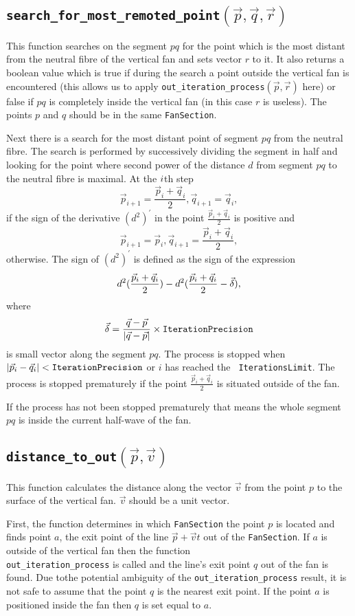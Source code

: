 \documentclass{article}
\begin{document}
\subsection{\tt search\_for\_most\_remoted\_point$(\vec{p}, \vec{q}, \vec{r})$}
This function searches on the segment $pq$ for the point which is the
most distant from the neutral fibre of the vertical fan and sets
vector $r$ to it. It also returns a boolean value which is true if
during the search a point outside the vertical fan is encountered
(this allows us to apply {\tt out\_iteration\_process$(\vec{p},
\vec{r})$} here) or false if $pq$ is completely inside the vertical
fan (in this case $r$ is useless). The points $p$ and $q$ should be in
the same {\tt FanSection}.

Next there is a search for the most distant point of segment
$pq$ from the neutral fibre. The search is performed by successively 
dividing the segment in half and looking for the point
where second power of the distance $d$
from segment $pq$ to the neutral fibre is maximal.
At the $i\/$th step 
\[ \vec{p}_{i+1} = \frac{\vec{p}_i+\vec{q}_i}{2}, \vec{q}_{i+1} = \vec{q}_i,\]
if the sign of the derivative $(d^2)^{\prime}$ in the point
$\frac{\vec{p}_i+\vec{q}_i}{2}$ is positive and 
\[\vec{p}_{i+1} = \vec{p}_i, \vec{q}_{i+1} = \frac{\vec{p}_i+\vec{q}_i}{2},\]
otherwise. 
The sign of $(d^2)^{\prime}$ is defined as the sign of the expression
\[d^2(\frac{\vec{p}_i+\vec{q}_i}{2}) -
d^2(\frac{\vec{p}_i+\vec{q}_i}{2}-\vec{\delta})\/,\] where \[\vec{\delta} =
\frac{\vec{q}-\vec{p}}{|\vec{q}-\vec{p}|}\times{\tt IterationPrecision}\] is
small vector along the segment $pq$. 
The process is stopped when 
$|\vec{p}_i-\vec{q}_i|<{\tt IterationPrecision}$ or $i$ has reached the {\tt
IterationsLimit\/}. The process is stopped prematurely if the point
$\frac{\vec{p}_i+\vec{q}_i}{2}$ is situated outside of the fan.

If the process has not been stopped prematurely that means the whole segment
$pq$ is inside the current half-wave of the fan.

\subsection{\tt distance\_to\_out$(\vec{p}, \vec{v})$}
This function calculates the distance along the vector
$\vec{v}$ from the point $p$ to the surface of the vertical fan. $\vec{v}$
should be a unit vector. 

First, the function determines in which {\tt FanSection} the point $p$
is located and finds point $a$, the exit point of the line
$\vec{p}+\vec{v}t$ out of the {\tt FanSection}. 
If $a$ is outside of the vertical fan then the function\\ 
{\tt out\_iteration\_process} is called and the line's exit point $q$ out of
the fan is found. Due tothe  potential ambiguity 
of the {\tt out\_iteration\_process} result, it is
not safe to assume that the point $q$ is the nearest exit point.
If the point $a$
is positioned inside the fan then $q$ is set equal to $a$.
\end{document}
